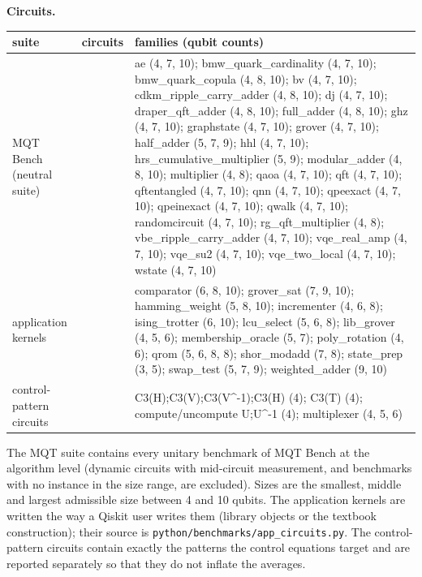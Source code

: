 \documentclass[
  10pt,
]{article}
\newcounter{none} %
\begin{document}
\textbf{Circuits.}

{\def\LTcaptype{none} %
\begin{longtable}[]{@{}
  >{\raggedright\arraybackslash}p{}
  >{\raggedright\arraybackslash}p{}
  >{\raggedright\arraybackslash}p{}@{}}
\toprule\noalign{}
\begin{minipage}[b]{\linewidth}\raggedright
suite
\end{minipage} & \begin{minipage}[b]{\linewidth}\raggedright
circuits
\end{minipage} & \begin{minipage}[b]{\linewidth}\raggedright
families (qubit counts)
\end{minipage} \\
\midrule\noalign{}
\endhead
\bottomrule\noalign{}
\endlastfoot
MQT Bench (neutral suite) & 87 & ae (4, 7, 10); bmw\_quark\_cardinality
(4, 7, 10); bmw\_quark\_copula (4, 8, 10); bv (4, 7, 10);
cdkm\_ripple\_carry\_adder (4, 8, 10); dj (4, 7, 10); draper\_qft\_adder
(4, 8, 10); full\_adder (4, 8, 10); ghz (4, 7, 10); graphstate (4, 7,
10); grover (4, 7, 10); half\_adder (5, 7, 9); hhl (4, 7, 10);
hrs\_cumulative\_multiplier (5, 9); modular\_adder (4, 8, 10);
multiplier (4, 8); qaoa (4, 7, 10); qft (4, 7, 10); qftentangled (4, 7,
10); qnn (4, 7, 10); qpeexact (4, 7, 10); qpeinexact (4, 7, 10); qwalk
(4, 7, 10); randomcircuit (4, 7, 10); rg\_qft\_multiplier (4, 8);
vbe\_ripple\_carry\_adder (4, 7, 10); vqe\_real\_amp (4, 7, 10);
vqe\_su2 (4, 7, 10); vqe\_two\_local (4, 7, 10); wstate (4, 7, 10) \\
application kernels & 37 & comparator (6, 8, 10); grover\_sat (7, 9,
10); hamming\_weight (5, 8, 10); incrementer (4, 6, 8); ising\_trotter
(6, 10); lcu\_select (5, 6, 8); lib\_grover (4, 5, 6);
membership\_oracle (5, 7); poly\_rotation (4, 6); qrom (5, 6, 8, 8);
shor\_modadd (7, 8); state\_prep (3, 5); swap\_test (5, 7, 9);
weighted\_adder (9, 10) \\
control-pattern circuits & 6 & C3(H);C3(V);C3(V\^{}-1);C3(H) (4); C3(T)
(4); compute/uncompute U;U\^{}-1 (4); multiplexer (4, 5, 6) \\
\end{longtable}
}

The MQT suite contains every unitary benchmark of MQT Bench at the
algorithm level (dynamic circuits with mid-circuit measurement, and
benchmarks with no instance in the size range, are excluded). Sizes are
the smallest, middle and largest admissible size between 4 and 10
qubits. The application kernels are written the way a Qiskit user writes
them (library objects or the textbook construction); their source is
\texttt{python/benchmarks/app\_circuits.py}. The control-pattern
circuits contain exactly the patterns the control equations target and
are reported separately so that they do not inflate the averages.
\end{document}
